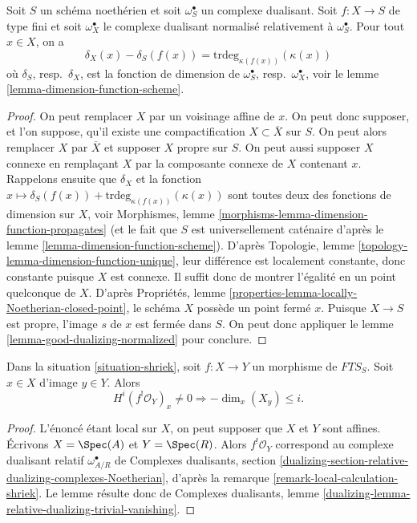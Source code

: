 \begin{lemma}
\label{lemma-good-dualizing-dimension-function}
Soit $S$ un schéma noethérien et soit $\omega_S^\bullet$ un complexe dualisant. Soit $f : X \to S$ de type fini et soit $\omega_X^\bullet$ le complexe dualisant normalisé relativement à $\omega_S^\bullet$. Pour tout $x \in X$, on a
$$
\delta_X(x) - \delta_S(f(x)) = \text{trdeg}_{\kappa(f(x))}(\kappa(x))
$$
où $\delta_S$, resp.\ $\delta_X$, est la fonction de dimension de $\omega_S^\bullet$, resp.\ $\omega_X^\bullet$, voir le lemme \ref{lemma-dimension-function-scheme}.
\end{lemma}

\begin{proof}
On peut remplacer $X$ par un voisinage affine de $x$. On peut donc supposer, et l'on suppose, qu'il existe une compactification $X \subset \overline{X}$ sur $S$. On peut alors remplacer $X$ par $\overline{X}$ et supposer $X$ propre sur $S$. On peut aussi supposer $X$ connexe en remplaçant $X$ par la composante connexe de $X$ contenant $x$. Rappelons ensuite que $\delta_X$ et la fonction
$x \mapsto \delta_S(f(x)) + \text{trdeg}_{\kappa(f(x))}(\kappa(x))$
sont toutes deux des fonctions de dimension sur $X$, voir Morphismes, lemme \ref{morphisms-lemma-dimension-function-propagates} (et le fait que $S$ est universellement caténaire d'après le lemme \ref{lemma-dimension-function-scheme}). D'après Topologie, lemme \ref{topology-lemma-dimension-function-unique}, leur différence est localement constante, donc constante puisque $X$ est connexe. Il suffit donc de montrer l'égalité en un point quelconque de $X$. D'après Propriétés, lemme \ref{properties-lemma-locally-Noetherian-closed-point}, le schéma $X$ possède un point fermé $x$. Puisque $X \to S$ est propre, l'image $s$ de $x$ est fermée dans $S$. On peut donc appliquer le lemme \ref{lemma-good-dualizing-normalized} pour conclure.
\end{proof}

\begin{lemma}
\label{lemma-shriek}
Dans la situation \ref{situation-shriek}, soit $f : X \to Y$ un morphisme de $\textit{FTS}_S$. Soit $x \in X$ d'image $y \in Y$. Alors
$$
H^i(f^!\mathcal{O}_Y)_x \not = 0
\Rightarrow - \dim_x(X_y) \leq i.
$$
\end{lemma}

\begin{proof}
L'énoncé étant local sur $X$, on peut supposer que $X$ et $Y$ sont affines. Écrivons $X = \Spec(A)$ et $Y = \Spec(R)$. Alors $f^!\mathcal{O}_Y$ correspond au complexe dualisant relatif $\omega_{A/R}^\bullet$ de Complexes dualisants, section \ref{dualizing-section-relative-dualizing-complexes-Noetherian}, d'après la remarque \ref{remark-local-calculation-shriek}. Le lemme résulte donc de Complexes dualisants, lemme \ref{dualizing-lemma-relative-dualizing-trivial-vanishing}.
\end{proof}


